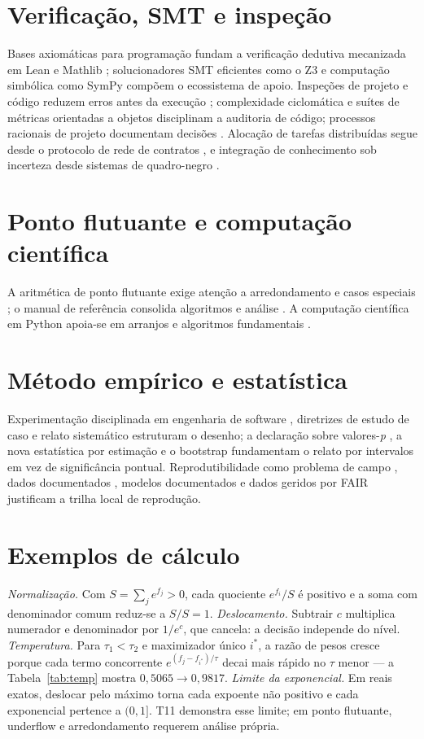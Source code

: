 \section{Verificação, SMT e inspeção}
Bases axiomáticas para programação \cite{hoare1969} fundam a verificação dedutiva mecanizada em Lean \cite{moura2021} e Mathlib \cite{mathlib2020}; solucionadores SMT eficientes como o Z3 \cite{demoura2008} e computação simbólica como SymPy \cite{meurer2017} compõem o ecossistema de apoio. Inspeções de projeto e código reduzem erros antes da execução \cite{fagan1976}; complexidade ciclomática \cite{mccabe1976} e suítes de métricas orientadas a objetos \cite{chidamber1994} disciplinam a auditoria de código; processos racionais de projeto documentam decisões \cite{parnas1986}. Alocação de tarefas distribuídas segue desde o protocolo de rede de contratos \cite{smith1980}, e integração de conhecimento sob incerteza desde sistemas de quadro-negro \cite{erman1980}.
\section{Ponto flutuante e computação científica}
A aritmética de ponto flutuante exige atenção a arredondamento e casos especiais \cite{goldberg1991}; o manual de referência consolida algoritmos e análise \cite{muller2018}. A computação científica em Python apoia-se em arranjos \cite{harris2020} e algoritmos fundamentais \cite{virtanen2020}.
\section{Método empírico e estatística}
Experimentação disciplinada em engenharia de software \cite{basili1986,wohlin2012}, diretrizes de estudo de caso \cite{runeson2009} e relato sistemático \cite{page2021} estruturam o desenho; a declaração sobre valores-\textit{p} \cite{wasserstein2016}, a nova estatística por estimação \cite{cumming2014} e o bootstrap \cite{efron1979} fundamentam o relato por intervalos em vez de significância pontual. Reprodutibilidade como problema de campo \cite{osc2015,collberg2016,ioannidis2005}, dados documentados \cite{gebru2021}, modelos documentados \cite{mitchell2019} e dados geridos por FAIR \cite{wilkinson2016} justificam a trilha local de reprodução.
\section{Exemplos de cálculo}
\textit{Normalização.} Com $S=\sum_j e^{f_j}>0$, cada quociente $e^{f_i}/S$ é positivo e a soma com denominador comum reduz-se a $S/S=1$. \textit{Deslocamento.} Subtrair $c$ multiplica numerador e denominador por $1/e^c$, que cancela: a decisão independe do nível. \textit{Temperatura.} Para $\tau_1<\tau_2$ e maximizador único $i^*$, a razão de pesos cresce porque cada termo concorrente $e^{(f_j-f_{i^*})/\tau}$ decai mais rápido no $\tau$ menor --- a Tabela~\ref{tab:temp} mostra $0{,}5065\to0{,}9817$. \textit{Limite da exponencial.} Em reais exatos, deslocar pelo máximo torna cada expoente não positivo e cada exponencial pertence a $(0,1]$. T11 demonstra esse limite; em ponto flutuante, underflow e arredondamento requerem análise própria.
